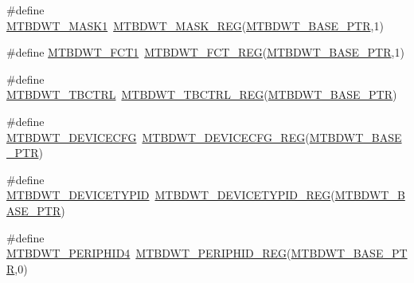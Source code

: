 \begin{DoxyCompactItemize}
\item 
\#define \hyperlink{group___m_t_b_d_w_t___register___accessor___macros_gae894a7aae5ee9a3e87a83d33342451da}{M\+T\+B\+D\+W\+T\+\_\+\+M\+A\+S\+K1}~\hyperlink{group___m_t_b_d_w_t___register___accessor___macros_ga5c5b8f3ae38de9e3006737c92fc2814c}{M\+T\+B\+D\+W\+T\+\_\+\+M\+A\+S\+K\+\_\+\+R\+EG}(\hyperlink{group___m_t_b_d_w_t___peripheral_ga97d048bfb5a11293a38c444b8347ff42}{M\+T\+B\+D\+W\+T\+\_\+\+B\+A\+S\+E\+\_\+\+P\+TR},1)
\item 
\#define \hyperlink{group___m_t_b_d_w_t___register___accessor___macros_gad659254c17bdfa6f4d25b8eeccc7eec2}{M\+T\+B\+D\+W\+T\+\_\+\+F\+C\+T1}~\hyperlink{group___m_t_b_d_w_t___register___accessor___macros_gaa319e11200b9cc2fe7bfb0b5dd40d0e8}{M\+T\+B\+D\+W\+T\+\_\+\+F\+C\+T\+\_\+\+R\+EG}(\hyperlink{group___m_t_b_d_w_t___peripheral_ga97d048bfb5a11293a38c444b8347ff42}{M\+T\+B\+D\+W\+T\+\_\+\+B\+A\+S\+E\+\_\+\+P\+TR},1)
\item 
\#define \hyperlink{group___m_t_b_d_w_t___register___accessor___macros_gaabe3e4c27fdc7c18a745c1129d06a68d}{M\+T\+B\+D\+W\+T\+\_\+\+T\+B\+C\+T\+RL}~\hyperlink{group___m_t_b_d_w_t___register___accessor___macros_ga8c3b4d03936e7f060a5c076768e31c3c}{M\+T\+B\+D\+W\+T\+\_\+\+T\+B\+C\+T\+R\+L\+\_\+\+R\+EG}(\hyperlink{group___m_t_b_d_w_t___peripheral_ga97d048bfb5a11293a38c444b8347ff42}{M\+T\+B\+D\+W\+T\+\_\+\+B\+A\+S\+E\+\_\+\+P\+TR})
\item 
\#define \hyperlink{group___m_t_b_d_w_t___register___accessor___macros_ga5d85a355ea3763f3ce91c860b33ecd40}{M\+T\+B\+D\+W\+T\+\_\+\+D\+E\+V\+I\+C\+E\+C\+FG}~\hyperlink{group___m_t_b_d_w_t___register___accessor___macros_ga3e7e1df1d240c41eec01b0d5b166b40a}{M\+T\+B\+D\+W\+T\+\_\+\+D\+E\+V\+I\+C\+E\+C\+F\+G\+\_\+\+R\+EG}(\hyperlink{group___m_t_b_d_w_t___peripheral_ga97d048bfb5a11293a38c444b8347ff42}{M\+T\+B\+D\+W\+T\+\_\+\+B\+A\+S\+E\+\_\+\+P\+TR})
\item 
\#define \hyperlink{group___m_t_b_d_w_t___register___accessor___macros_gae3c0de787e5ffb8689542299ac138e16}{M\+T\+B\+D\+W\+T\+\_\+\+D\+E\+V\+I\+C\+E\+T\+Y\+P\+ID}~\hyperlink{group___m_t_b_d_w_t___register___accessor___macros_ga1b0104249607c6fb6ae3a943e3ffaa11}{M\+T\+B\+D\+W\+T\+\_\+\+D\+E\+V\+I\+C\+E\+T\+Y\+P\+I\+D\+\_\+\+R\+EG}(\hyperlink{group___m_t_b_d_w_t___peripheral_ga97d048bfb5a11293a38c444b8347ff42}{M\+T\+B\+D\+W\+T\+\_\+\+B\+A\+S\+E\+\_\+\+P\+TR})
\item 
\#define \hyperlink{group___m_t_b_d_w_t___register___accessor___macros_ga8ef257fe5f8d95bd784008c0fed9375e}{M\+T\+B\+D\+W\+T\+\_\+\+P\+E\+R\+I\+P\+H\+I\+D4}~\hyperlink{group___m_t_b_d_w_t___register___accessor___macros_ga18a6f971f5ddf5bd0f3c5fd2d2b3b2da}{M\+T\+B\+D\+W\+T\+\_\+\+P\+E\+R\+I\+P\+H\+I\+D\+\_\+\+R\+EG}(\hyperlink{group___m_t_b_d_w_t___peripheral_ga97d048bfb5a11293a38c444b8347ff42}{M\+T\+B\+D\+W\+T\+\_\+\+B\+A\+S\+E\+\_\+\+P\+TR},0)

\end{DoxyCompactItemize}
